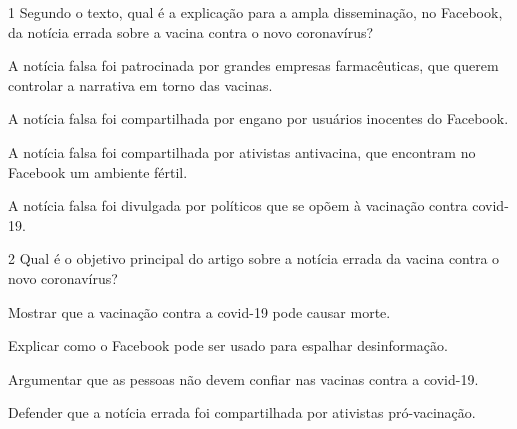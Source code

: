\num{1} Segundo o texto, qual é a explicação para a ampla
disseminação, no Facebook, da notícia errada sobre a vacina contra o novo coronavírus?

\begin{escolha}
\item A notícia falsa foi patrocinada por grandes empresas farmacêuticas,
que querem controlar a narrativa em torno das vacinas.

\item A notícia falsa foi compartilhada por engano por usuários inocentes
do Facebook.

\item A notícia falsa foi compartilhada por ativistas antivacina, que
encontram no Facebook um ambiente fértil.

\item A notícia falsa foi divulgada por políticos que se opõem à vacinação contra covid-19.
\end{escolha}


\num{2} Qual é o objetivo principal do artigo sobre a notícia errada da vacina
contra o novo coronavírus?

\begin{escolha}
\item Mostrar que a vacinação contra a covid-19 pode causar morte.

\item Explicar como o Facebook pode ser usado para espalhar desinformação.

\item Argumentar que as pessoas não devem confiar nas vacinas contra a covid-19.

\item Defender que a notícia errada foi compartilhada por ativistas pró-vacinação.
\end{escolha}


